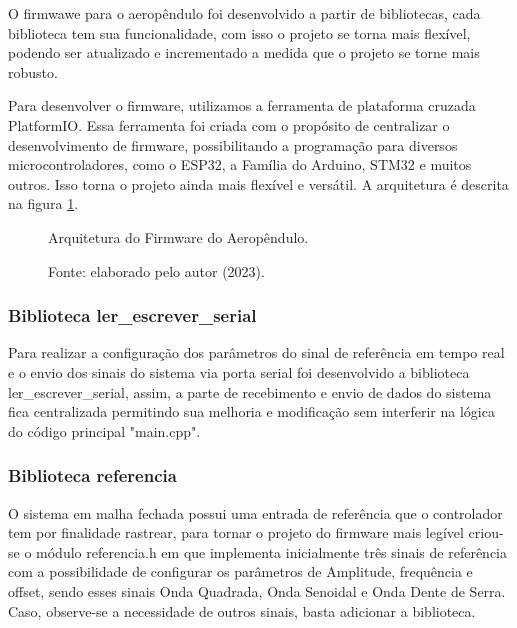 O firmwawe para o aeropêndulo foi desenvolvido a partir de bibliotecas, cada biblioteca tem sua funcionalidade, com isso o projeto se torna mais flexível, podendo ser atualizado e incrementado a medida que o projeto se torne mais robusto. 

Para desenvolver o firmware, utilizamos a ferramenta de plataforma cruzada PlatformIO. Essa ferramenta foi criada com o propósito de centralizar o desenvolvimento de firmware, possibilitando a programação para diversos microcontroladores, como o ESP32, a Família do Arduino, STM32 e muitos outros. Isso torna o projeto ainda mais flexível e versátil. A arquitetura é descrita na figura \ref{fig3:image_16}.


\begin{figure}[!h]
	\centering
	\caption{Arquitetura do Firmware do Aeropêndulo.}
	\caption*{Fonte: elaborado pelo autor (2023).}
	\label{fig3:image_16}
\end{figure}


\subsubsection{Biblioteca ler\_escrever\_serial}

Para realizar a configuração dos parâmetros do sinal de referência em tempo real e o envio dos sinais do sistema via porta serial foi desenvolvido a biblioteca ler\_escrever\_serial, assim, a parte de recebimento e envio de dados do sistema fica centralizada permitindo sua melhoria e modificação sem interferir na lógica do código principal "main.cpp".

\subsubsection{Biblioteca referencia}

O sistema em malha fechada possui uma entrada de referência que o controlador tem por finalidade rastrear, para tornar o projeto do firmware mais legível criou-se o módulo referencia.h em que implementa inicialmente três sinais de referência com a possibilidade de configurar os parâmetros de Amplitude, frequência e offset, sendo esses sinais Onda Quadrada, Onda Senoidal e Onda Dente de Serra. Caso, observe-se a necessidade de outros sinais, basta adicionar a biblioteca.


